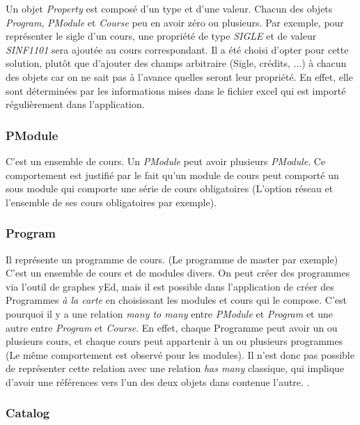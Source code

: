 Un objet \textit{Property} est composé d'un type et d'une valeur. Chacun des objets \textit{Program}, \textit{PModule} et \textit{Course} peu en avoir zéro ou plusieurs. Par exemple, pour représenter le sigle d'un cours, une propriété de type \textit{SIGLE} et de valeur \textit{SINF1101} sera ajoutée au cours correspondant. Il a été choisi d'opter pour cette solution, plutôt que d'ajouter des champs arbitraire (Sigle, crédits, ...) à chacun des objets car on ne sait pas à l'avance quelles seront leur propriété. En effet, elle sont déterminées par les informations mises dans le fichier excel qui est importé régulièrement dans l'application. 

\subsubsection{PModule}

C'est un ensemble de cours. Un \textit{PModule} peut avoir plusieurs \textit{PModule}. Ce comportement est justifié par le fait qu'un module de cours peut comporté un sous module qui comporte une série de cours obligatoires (L'option réseau et l'ensemble de ses cours obligatoires par exemple).

\subsubsection{Program}

Il représente un programme de cours. (Le programme de master par exemple) C'est un ensemble de cours et de modules divers. On peut créer des programmes via l'outil de graphes yEd, mais il est possible dans l'application de créer des Programmes \textit{à la carte} en choisissant les modules et cours qui le compose. C'est pourquoi il y a une relation \textit{many to many} entre \textit{PModule} et \textit{Program} et une autre entre \textit{Program} et \textit{Course}. En effet, chaque Programme peut avoir un ou plusieurs cours, et chaque cours peut appartenir à un ou plusieurs programmes (Le même comportement est observé pour les modules). Il n'est donc pas possible de représenter cette relation avec une relation \textit{has many} classique, qui implique d'avoir une références vers l'un des deux objets dans contenue l'autre. \cite{active_record}. 

\subsubsection{Catalog} 

